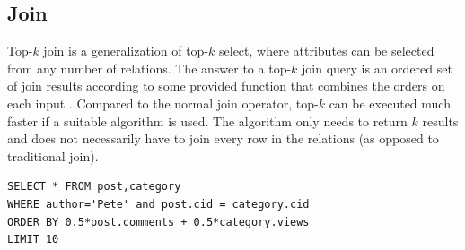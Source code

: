 \subsection{Join}

Top-$k$ join is a generalization of top-$k$ select, where attributes can
be selected from any number of relations. The answer to a top-$k$ join
query is an ordered set of join results according to some provided
function that combines the orders on each input \cite{topkjoin}.
Compared to the normal join operator, top-$k$ can be executed much
faster if a suitable algorithm is used. The algorithm only needs to
return $k$ results and does not necessarily have to join every row in
the relations (as opposed to traditional join).

\begin{lstlisting}[caption={Top-$k$ join example}, label={lst:topk-join}]
SELECT * FROM post,category
WHERE author='Pete' and post.cid = category.cid
ORDER BY 0.5*post.comments + 0.5*category.views
LIMIT 10 
\end{lstlisting}
